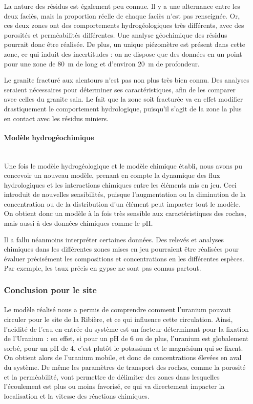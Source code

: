 \documentclass{article}
\begin{document}
La nature des résidus est également peu connue. Il y a une alternance entre les deux faciès, mais la proportion réelle de chaque faciès n’est pas renseignée. Or, ces deux zones ont des comportements hydrogéologiques très différents, avec des porosités et perméabilités différentes. Une analyse géochimique des résidus pourrait donc être réalisée. De plus, un unique piézomètre est présent dans cette zone, ce qui induit des incertitudes : on ne dispose que des données en un point pour une zone de 80~m de long et d’environ 20~m de profondeur.

Le granite fracturé aux alentours n’est pas non plus très bien connu. Des analyses seraient nécessaires pour déterminer ses caractéristiques, afin de les comparer avec celles du granite sain. Le fait que la zone soit fracturée va en effet modifier drastiquement le comportement hydrologique, puisqu’il s’agit de la zone la plus en contact avec les résidus miniers.

\paragraph{Modèle hydrogéochimique \\ \\}
Une fois le modèle hydrogéologique et le modèle chimique établi, nous avons pu concevoir un nouveau modèle, prenant en compte la dynamique des flux hydrologiques et les interactions chimiques entre les éléments mis en jeu. Ceci introduit de nouvelles sensibilités, puisque l’augmentation ou la diminution de la concentration ou de la distribution d’un élément peut impacter tout le modèle. On obtient donc un modèle à la fois très sensible aux caractéristiques des roches, mais aussi à des données chimiques comme le pH.

Il a fallu néanmoins interpréter certaines données. Des relevés et analyses chimiques dans les différentes zones mises en jeu pourraient être réalisées pour évaluer précisément les compositions et concentrations en les différentes espèces. Par exemple, les taux précis en gypse ne sont pas connus partout.

\subsubsection{Conclusion pour le site}
\paragraph{} Le modèle réalisé nous a permis de comprendre comment l’uranium pouvait circuler pour le site de la Ribière, et ce qui influence cette circulation. Ainsi, l’acidité de l’eau en entrée du système est un facteur déterminant pour la fixation de l’Uranium~: en effet, si pour un pH de 6 ou de plus, l’uranium est globalement sorbé, pour un pH de 4, c’est plutôt le potassium et le magnésium qui se fixent. On obtient alors de l’uranium mobile, et donc de concentrations élevées en aval du système. De même les paramètres de transport des roches, comme la porosité et la perméabilité, vont permettre de délimiter des zones dans lesquelles l’écoulement est plus ou moins favorisé, ce qui va directement impacter la localisation et la vitesse des réactions chimiques.
\end{document}
